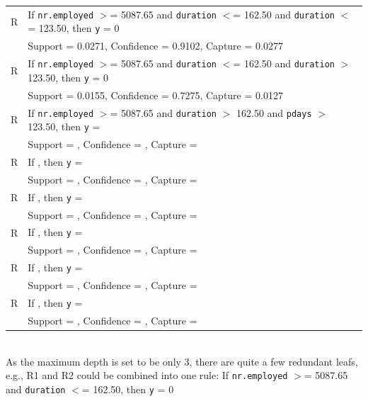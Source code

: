 \documentclass[11pt,a4paper]{article}
\newcounter{magicrownumbers}
\begin{document}
    \setcounter{magicrownumbers}{0}
    \newcommand\rules{\stepcounter{magicrownumbers}\arabic{magicrownumbers}}
    \begin{tabular}{r l}
        R\rules & If \texttt{nr.employed} $>$= 5087.65 and \texttt{duration} $<$= 162.50 and \texttt{duration} $<$= 123.50, then \texttt{y} = 0 \\
        & Support = 0.0271, Confidence = 0.9102, Capture = 0.0277\\
        
        R\rules & If \texttt{nr.employed} $>$= 5087.65 and \texttt{duration} $<$= 162.50 and \texttt{duration} $>$ 123.50, then \texttt{y} = 0 \\
        & Support = 0.0155, Confidence = 0.7275, Capture = 0.0127\\
        
        R\rules & If \texttt{nr.employed} $>$= 5087.65 and \texttt{duration} $>$ 162.50 and \texttt{pdays} $>$ 123.50, then \texttt{y} =  \\
        & Support = , Confidence = , Capture = \\
        
        R\rules & If , then \texttt{y} =  \\
        & Support = , Confidence = , Capture = \\
        
        R\rules & If , then \texttt{y} =  \\
        & Support = , Confidence = , Capture = \\
        
        R\rules & If , then \texttt{y} =  \\
        & Support = , Confidence = , Capture = \\
        
        R\rules & If , then \texttt{y} =  \\
        & Support = , Confidence = , Capture = \\
        
        R\rules & If , then \texttt{y} =  \\
        & Support = , Confidence = , Capture = \\
        
    \end{tabular} \\
    As the maximum depth is set to be only 3, there are quite a few redundant leafs, e.g., R1 and R2 could be combined into one rule: If \texttt{nr.employed} $>$= 5087.65 and \texttt{duration} $<$= 162.50, then \texttt{y} = 0
    
\end{document}
